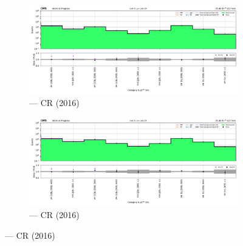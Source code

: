 \begin{figure}[htbp]
    \centering
    \begin{subfigure}[b]{0.49\textwidth}
        \includegraphics[width=\textwidth]{chapters/higgstoinv/figures/mountain_ranges/2016/VH/Wmunu_tree_fit_s-abs_values_VH_cats.pdf}
        \caption{\VH --- \singleMuCr \gls{CR} (2016)}
    \end{subfigure}
    \hfill
    \begin{subfigure}[b]{0.49\textwidth}
        \includegraphics[width=\textwidth]{chapters/higgstoinv/figures/mountain_ranges/2016/VH/Wenu_tree_fit_s-abs_values_VH_cats.pdf}
        \caption{\VH --- \singleEleCr \gls{CR} (2016)}
    \end{subfigure}


\end{figure}
